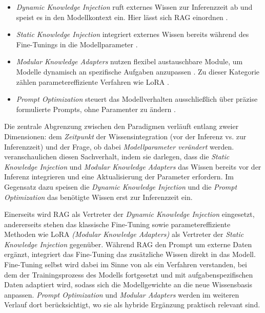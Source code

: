 \begin{itemize}
    \item \textit{Dynamic Knowledge Injection} ruft externes Wissen zur Inferenzzeit ab und speist es in den Modellkontext ein. Hier lässt sich RAG einordnen \autocite[3]{Song.2025}.
    \item \textit{Static Knowledge Injection} integriert externes Wissen bereits während des Fine-Tunings in die Modellparameter \autocite[4]{Song.2025}.
    \item \textit{Modular Knowledge Adapters} nutzen flexibel austauschbare Module, um Modelle dynamisch an spezifische Aufgaben anzupassen \autocite[4]{Song.2025}. Zu dieser Kategorie zählen parametereffiziente Verfahren wie LoRA \autocite[1]{Hu.2022}.
    \item \textit{Prompt Optimization} steuert das Modellverhalten ausschließlich über präzise formulierte Prompts, ohne Paramenter zu ändern \autocite[4]{Song.2025}.
\end{itemize}

Die zentrale Abgrenzung zwischen den Paradigmen verläuft entlang zweier Dimensionen: dem \textit{Zeitpunkt} der Wissensintegration (vor der Inferenz vs. zur  Inferenzzeit) und der Frage, ob dabei \textit{Modellparameter verändert} werden. \textcite[3]{Song.2025} veranschaulichen diesen Sachverhalt, indem sie darlegen, dass die \textit{Static Knowledge Injection} und \textit{Modular Knowledge Adapters} das Wissen bereits vor der Inferenz integrieren und eine Aktualisierung der Parameter erfordern. Im Gegensatz dazu speisen die \textit{Dynamic Knowledge Injection} und die \textit{Prompt Optimization} das benötigte Wissen erst zur Inferenzzeit ein.

Einerseits wird RAG als Vertreter der \textit{Dynamic Knowledge Injection} eingesetzt, andererseits stehen das klassische Fine-Tuning sowie parametereffiziente Methoden wie LoRA \textit{(Modular Knowledge Adapters)} als Vertreter der \textit{Static Knowledge Injection} gegenüber.
Während RAG den Prompt um externe Daten ergänzt, integriert das Fine-Tuning das zusätzliche Wissen direkt in das Modell. Fine-Tuning selbst wird dabei im Sinne von \textcite[1]{Ovadia.2024} als ein Verfahren verstanden, bei dem der Trainingsprozess des Modells fortgesetzt und mit aufgabenspezifischen Daten adaptiert wird, sodass sich die Modellgewichte an die neue Wissensbasis anpassen. \textit{Prompt Optimization} und \textit{Modular Adapters} werden im weiteren Verlauf dort berücksichtigt, wo sie als hybride Ergänzung praktisch relevant sind.